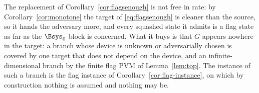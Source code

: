 
\begin{remark}\label{rem:flagcost}
The replacement of Corollary~\ref{cor:flagsenough} is not free in rate: by
Corollary~\ref{cor:monotone} the target of \eqref{eq:flagsenough} is cleaner
than the source, so it hands the adversary more, and every squashed state it
admits is a flag state as far as the $\Bsys_0$ block is concerned. What it
buys is that $G$ appears nowhere in the target: a branch whose device is
unknown or adversarially chosen is covered by one target that does not depend
on the device, and an infinite-dimensional branch by the finite flag PVM of
Lemma~\ref{lem:top}. The instance of such a branch is the flag instance of
Corollary~\ref{cor:flag-instance}, on which by construction nothing is
assumed and nothing may be.
\end{remark}
